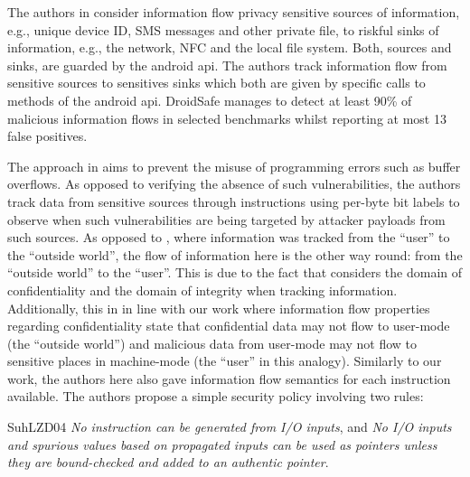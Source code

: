 The authors in \cite{GordonKPGNR15} consider information flow privacy sensitive sources of information, e.g., unique device ID, SMS messages and other private file, to riskful sinks of information, e.g., the network, NFC and the local file system.
Both, sources and sinks, are guarded by the android \gls{api}.
The authors track information flow from sensitive sources to sensitives sinks which both are given by specific calls to methods of the android \gls{api}.
DroidSafe manages to detect at least 90\% of malicious information flows in selected benchmarks whilst reporting at most 13 false positives.

The approach in \cite{SuhLZD04} aims to prevent the misuse of programming errors such as buffer overflows.
As opposed to verifying the absence of such vulnerabilities, the authors track data from sensitive sources through instructions using per-byte bit labels to observe when such vulnerabilities are being targeted by attacker payloads from such sources.
As opposed to \cite{GordonKPGNR15}, where information was tracked from the \enquote{user} to the \enquote{outside world}, the flow of information here is the other way round: from the \enquote{outside world} to the \enquote{user}.
This is due to the fact that \cite{GordonKPGNR15} considers the domain of confidentiality and \cite{SuhLZD04} the domain of integrity when tracking information.
Additionally, this in in line with our work where information flow properties regarding confidentiality state that confidential data may not flow to user-mode (the \enquote{outside world}) and malicious data from user-mode may not flow to sensitive places in machine-mode (the \enquote{user} in this analogy).
Similarly to our work, the authors here also gave information flow semantics for each instruction available.
The authors propose a simple security policy involving two rules:
\begin{displaycquote}{SuhLZD04}
    \textit{No instruction can be generated from I/O inputs}, and \textit{No I/O inputs and spurious values based on propagated inputs can be used as pointers unless they are bound-checked and added to an authentic pointer}.
\end{displaycquote}

